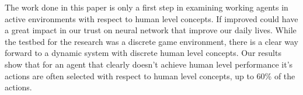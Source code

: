 
The work done in this paper is only a first step in examining working agents in active environments with respect to human level concepts. If improved could have a great impact in our trust on neural network that improve our daily lives. While the testbed for the research was a discrete game environment, there is a clear way forward to a dynamic system with discrete human level concepts. Our results show that for an agent that clearly doesn't achieve human level performance it's actions are often selected with respect to human level concepts, up to 60\% of the actions. 
